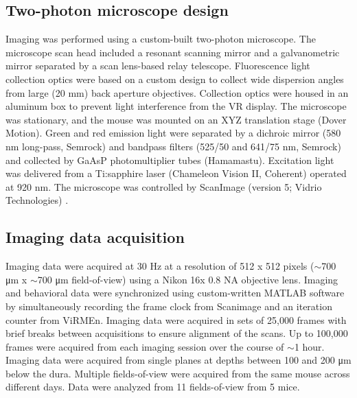 \subsection{Two-photon microscope design} \label{methods:microscope}
Imaging was performed using a custom-built two-photon microscope. The microscope scan head included a resonant scanning mirror and a galvanometric mirror separated by a scan lens-based relay telescope. Fluorescence light collection optics were based on a custom design to collect wide dispersion angles from large (20 mm) back aperture objectives. Collection optics were housed in an aluminum box to prevent light interference from the VR display. The microscope was stationary, and the mouse was mounted on an XYZ translation stage (Dover Motion). Green and red emission light were separated by a dichroic mirror (580 nm long-pass, Semrock) and bandpass filters (525/50 and 641/75 nm, Semrock) and collected by GaAsP photomultiplier tubes (Hamamastu). Excitation light was delivered from a Ti:sapphire laser (Chameleon Vision II, Coherent) operated at 920 nm. The microscope was controlled by ScanImage (version 5; Vidrio Technologies) \citep{Pologruto:2003bq}.

\subsection{Imaging data acquisition} \label{methods:data_acq}
Imaging data were acquired at 30 Hz at a resolution of 512 x 512 pixels ($\sim$700 μm x $\sim$700 μm field-of-view) using a Nikon 16x 0.8 NA objective lens. Imaging and behavioral data were synchronized using custom-written MATLAB software by simultaneously recording the frame clock from Scanimage and an iteration counter from ViRMEn. Imaging data were acquired in sets of 25,000 frames with brief breaks between acquisitions to ensure alignment of the scans. Up to 100,000 frames were acquired from each imaging session over the course of $\sim$1 hour. Imaging data were acquired from single planes at depths between 100 and 200 μm below the dura. Multiple fields-of-view were acquired from the same mouse across different days. Data were analyzed from 11 fields-of-view from 5 mice. 


